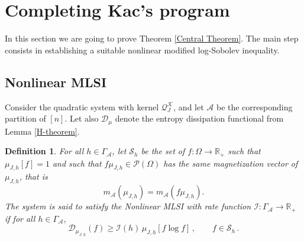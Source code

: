 \documentclass[11pt,reqno]{amsart}
\numberwithin{equation}{section}
\numberwithin{figure}{section}
\newtheorem{definition}[theorem]{Definition}
\renewcommand{\geq}{\ge} %
\newcommand{\1}{\mathds{1}}
\newcommand{\tc}{\,|\,}
\let\O=\Omega
\let\G=\Gamma
\newcommand{\cA}{\ensuremath{\mathcal A}}
\newcommand{\cD}{\ensuremath{\mathcal D}}
\newcommand{\cG}{\ensuremath{\mathcal G}}
\newcommand{\cI}{\ensuremath{\mathcal I}}
\newcommand{\cK}{\ensuremath{\mathcal K}}
\newcommand{\cP}{\ensuremath{\mathcal P}}
\newcommand{\cQ}{\ensuremath{\mathcal Q}}
\newcommand{\cS}{\ensuremath{\mathcal S}}
\newcommand{\bbR}{{\ensuremath{\mathbb R}} }
\begin{document}
%
%
%
%
%



\section{Completing Kac's program}\label{sec:kac}
In this section we are going to prove Theorem \ref{Central Theorem}. The main step consists in establishing a suitable nonlinear modified log-Sobolev inequality. 
\subsection{Nonlinear MLSI}\label{sec:nmlsi}
Consider the quadratic system with kernel $\cQ^\cK_J$, and let $\cA$ be the corresponding partition of $[n]$. Let also $\cD_\mu$ %
denote the entropy dissipation functional from Lemma \ref{H-theorem}.  
\begin{definition}\label{def:nmlsi}
For all $h\in\G_\cA$, let $\cS_h$ be the set of $f:\O\to \bbR_+$ such that $\mu_{J,h}[f] = 1$ and such that $f\mu_{J,h}\in\cP(\O)$ has the same magnetization vector of $\mu_{J,h}$, that is \[m_\cA(\mu_{J,h})=m_\cA(f\mu_{J,h}).\]  The system is said to satisfy the {\em Nonlinear MLSI} with rate function \(\cI:\G_\cA\to \bbR_+\) if for all $h\in\G_\cA$, %
\begin{equation}\label{nonlinear log sobolev}
    \mathcal{D}_{\mu_{J,h}}(f)  \ge \cI(h)\,\mu_{J,h}\left[f\log f\right] 
\,,\qquad f\in\cS_h 
\,.
\end{equation}
\end{definition}
\end{document}
